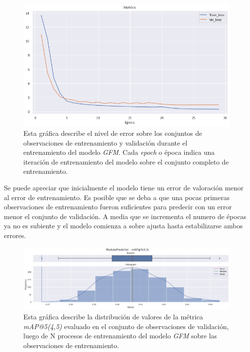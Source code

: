 \documentclass[11pt,a4paper,twoside]{thesis}
\begin{document}
\begin{figure}[ht]
	\centering
	\includegraphics[width=13cm]{./images/metrics-GFM-train-val-loss.png}
	\caption{Esta gráfica describe el nivel de error sobre los conjuntos
		de observaciones de entrenamiento y validación durante el
		entrenamiento del modelo \textit{GFM}. Cada \textit{epoch} o época indica
		una iteración de entrenamiento del modelo sobre el conjunto completo
		de entrenamiento.}
\end{figure}

Se puede apreciar que inicialmente el modelo tiene un error de valoración menor
al error de entrenamiento. Es posible que se deba a que una pocas primeras
observaciones de entrenamiento fueron suficientes para predecir con un error
menor el conjunto de validación. A media que se incrementa el numero de épocas
ya no es subiente y el modelo comienza a sobre ajusta hasta estabilizarse ambos
errores.

\clearpage

\begin{figure}[h!]
	\centering
	\includegraphics[width=15cm]{./images/metrics-GFM-mapk.png}
	\caption{Esta gráfica describe la distribución de valores de la
		métrica \textit{mAP@5(4,5)} evaluado en el conjunto de observaciones
		de validación, luego de N procesos de entrenamiento del modelo
		\textit{GFM} sobre las observaciones de entrenamiento.}
\end{figure}
\end{document}

